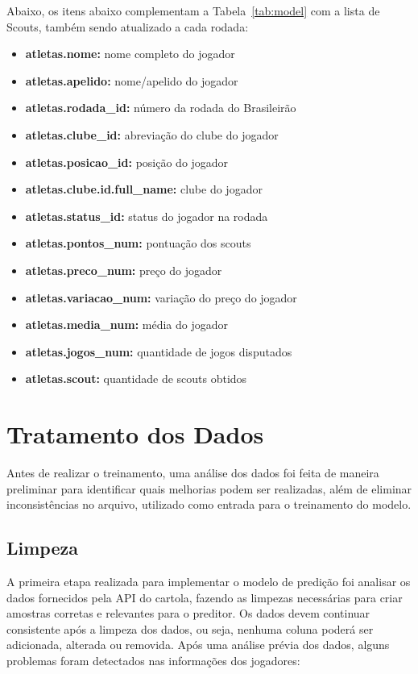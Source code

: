 \documentclass[conference]{IEEEtran}
\newcommand{\rtab}[1]{Tabela~\ref{tab:#1}}
\begin{document}
Abaixo, os  itens abaixo  complementam a \rtab{model}  com a  lista de
Scouts, também sendo atualizado a cada rodada:

\begin{itemize}

\item \textbf{atletas.nome:}                nome completo do jogador
\item \textbf{atletas.apelido:}             nome/apelido do jogador
\item \textbf{atletas.rodada\_id:}          número da rodada do Brasileirão
\item \textbf{atletas.clube\_id:}           abreviação do clube do jogador
\item \textbf{atletas.posicao\_id:}         posição do jogador
\item \textbf{atletas.clube.id.full\_name:} clube do jogador
\item \textbf{atletas.status\_id:}          status do jogador na rodada
\item \textbf{atletas.pontos\_num:}         pontuação dos scouts
\item \textbf{atletas.preco\_num:}          preço do jogador
\item \textbf{atletas.variacao\_num:}       variação do preço do jogador
\item \textbf{atletas.media\_num:}          média do jogador
\item \textbf{atletas.jogos\_num:}          quantidade de jogos disputados
\item \textbf{atletas.scout:}               quantidade de scouts obtidos

\end{itemize}

\section{Tratamento dos Dados}

Antes  de realizar  o treinamento,  uma análise  dos dados  foi feita
de  maneira  preliminar para  identificar  quais  melhorias podem  ser
realizadas, além  de eliminar inconsistências no  arquivo, utilizado
como entrada para o treinamento do modelo.

\subsection{Limpeza}

A primeira  etapa realizada  para implementar  o modelo  de predição
foi  analisar os  dados fornecidos  pela  API do  cartola, fazendo  as
limpezas necessárias para criar amostras corretas e relevantes para o
preditor. Os  dados devem  continuar consistente  após a  limpeza dos
dados, ou  seja, nenhuma  coluna poderá  ser adicionada,  alterada ou
removida. Após uma análise prévia dos dados, alguns problemas foram
detectados nas informações dos jogadores:
\end{document}
